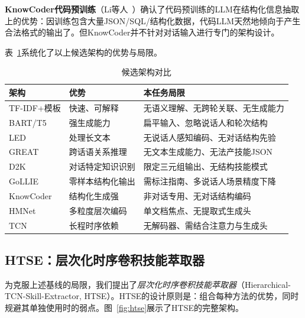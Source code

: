 \documentclass[conference]{IEEEtran}
\begin{document}
\textbf{KnowCoder代码预训练}（Li等人~\cite{li2024knowcoder}）确认了代码预训练的LLM在结构化信息抽取上的优势：因训练包含大量JSON/SQL/结构化数据，代码LLM天然地倾向于产生合法格式的输出了。但KnowCoder并不针对对话输入进行专门的架构设计。

表~\ref{tab:arch_compare}系统化了以上候选架构的优势与局限。

\begin{table}[h]
\centering
\caption{候选架构对比}
\label{tab:arch_compare}
\setlength{\tabcolsep}{3pt}
\renewcommand{\arraystretch}{1.15}
\begin{tabular}{p{2.0cm}p{1.8cm}p{1.8cm}}
\toprule
架构 & 优势 & 本任务局限 \\
\midrule
TF-IDF+模板 & 快速、可解释 & 无语义理解、无跨轮关联、无生成能力 \\
BART/T5~\cite{lewis2019bart} & 强生成能力 & 扁平输入、忽略说话人和轮次结构 \\
LED~\cite{beltagy2020longformer} & 处理长文本 & 无说话人感知编码、无对话结构先验 \\
GREAT~\cite{xu2022great} & 跨话语关系推理 & 无文本生成能力、无法产技能JSON \\
D2K~\cite{yu2022d2k} & 对话特定知识识别 & 限定三元组输出、无结构技能模式 \\
GoLLIE~\cite{sainz2023gollie} & 零样本结构化输出 & 需标注指南、多说话人场景精度下降 \\
KnowCoder~\cite{li2024knowcoder} & 结构化生成强 & 非对话专用、无对话结构编码 \\
HMNet~\cite{zhu2020hmnet} & 多粒度层次编码 & 单文档焦点、无提取式生成头 \\
TCN~\cite{bai2018tcn} & 长程时序依赖 & 无解码器、需结合注意力与生成头 \\
\bottomrule
\end{tabular}
\end{table}

\subsection{HTSE：层次化时序卷积技能萃取器}

为克服上述基线的局限，我们提出了\emph{层次化时序卷积技能萃取器}（Hierarchical-TCN-Skill-Extractor, HTSE）。HTSE的设计原则是：组合每种方法的优势，同时规避其单独使用时的弱点。图~\ref{fig:htse}展示了HTSE的完整架构。
\end{document}
